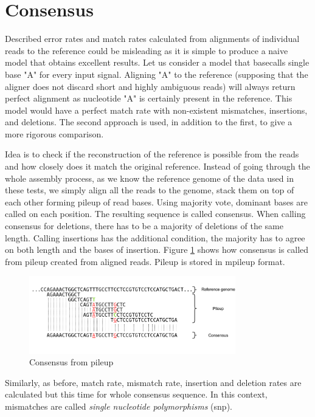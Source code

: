\documentclass[times, utf8, diplomski, numeric, english]{fer}
\begin{document}
\section{Consensus}
Described error rates and match rates calculated from alignments of individual reads to the reference could be misleading as it is simple to produce a naive model that obtains excellent results. Let us consider a model that basecalls single base "A" for every input signal. Aligning "A" to the reference (supposing that the aligner does not discard short and highly ambiguous reads) will always return perfect alignment as nucleotide "A" is certainly present in the reference. This model would have a perfect match rate with non-existent mismatches, insertions, and deletions.  The second approach is used, in addition to the first, to give a more rigorous comparison.

Idea is to check if the reconstruction of the reference is possible from the reads and how closely does it match the original reference. Instead of going through the whole assembly process, as we know the reference genome of the data used in these tests, we simply align all the reads to the genome, stack them on top of each other forming pileup of read bases. Using majority vote, dominant bases are called on each position. The resulting sequence is called consensus. When calling consensus for deletions,  there has to be a majority of deletions of the same length. Calling insertions has the additional condition,  the majority has to agree on both length and the bases of insertion. Figure \ref{fg:consensus} shows how consensus is called from pileup created from aligned reads. Pileup is stored in mpileup format.  


\begin{figure}[!ht]
	\begin{center}
		\includegraphics[width=0.8\textwidth]{./imgs/consnesus.png}
		\caption{Consensus from pileup}
		\label{fg:consensus}
	\end{center}
\end{figure}


Similarly, as before, match rate, mismatch rate, insertion and deletion rates are calculated but this time for whole consensus sequence. In this context, mismatches are called \textit{single nucleotide polymorphisms} (snp).
\end{document}

